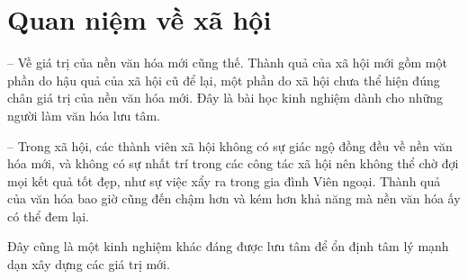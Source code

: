 \section{Quan niệm về xã hội} %
\label{sec:96_97_xa_hoi}

-- Về giá trị của nền văn hóa mới cũng thế. Thành quả của xã hội mới gồm một phần do hậu quả của xã hội cũ để lại, một phần do xã hội chưa thể hiện đúng chân giá trị của nền văn hóa mới. Đây là bài học kinh nghiệm dành cho những người làm văn hóa lưu tâm.

-- Trong xã hội, các thành viên xã hội không có sự giác ngộ đồng đều về nền văn hóa mới, và không có sự nhất trí trong các công tác xã hội nên không thể chờ đợi mọi kết quả tốt đẹp, như sự việc xẩy ra trong gia đình Viên ngoại. Thành quả của văn hóa bao giờ cũng đến chậm hơn và kém hơn khả năng mà nền văn hóa ấy có thể đem lại.

Đây cũng là một kinh nghiệm khác đáng được lưu tâm để ổn định tâm lý mạnh dạn xây dựng các giá trị mới.

